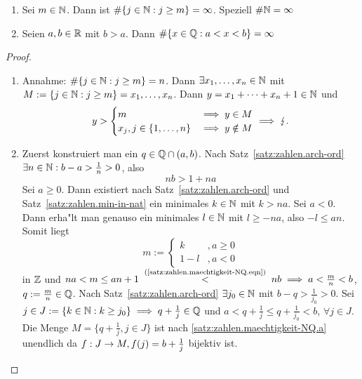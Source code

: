 \documentclass[12pt]{scrreprt}
\begin{document}
\begin{satz}\label{satz:zahlen.maechtigkeit-NQ}
\begin{enumerate}
\item \label{satz:zahlen.maechtigkeit-NQ.a}
Sei $m \in \mathbb{N}$. Dann ist $\#\{j\in\mathbb{N}:j\ge m\} = \infty$. Speziell $\#\mathbb{N} = \infty$
\item \label{satz:zahlen.maechtigkeit-NQ.b}
Seien $a, b \in \mathbb{R}$ mit $b > a$. Dann $\#\{x \in \mathbb{Q}:a < x<b\} = \infty$
\end{enumerate}
\end{satz}
\begin{proof}
\begin{enumerate}
\item Annahme: $\#\{j\in\mathbb{N}:j\ge m\} = n$. Dann $\exists x_1,\dotsc,x_n\in \mathbb{N}$
mit $M:=\{j\in\mathbb{N}:j\ge m\}={x_1, \dotsc, x_n}$. Dann
$y=x_1 + \dotsb  + x_n + 1 \in \mathbb{N}$ und 
\[ y >\begin{cases} m &\implies y \in M \\ x_j, j \in \{1, \dotsc, n\} & \implies y \notin M \end{cases}\implies\lightning.\]
\item Zuerst konstruiert man ein $q \in \mathbb{Q} \cap (a,b)$. Nach Satz~\ref{satz:zahlen.arch-ord} 
$\exists n \in \mathbb{N} : b-a > \frac{1}{n} > 0$, also 
\begin{equation}
nb > 1+na \label{satz:zahlen.maechtigkeit-NQ.eqn}\tag{$*$}
\end{equation}
Sei $a \ge 0$. Dann existiert nach Satz~\ref{satz:zahlen.arch-ord} und Satz~\ref{satz:zahlen.min-in-nat} ein minimales
$k\in\mathbb{N}$ mit $k>na$. Sei $a<0$. Dann erha"lt man genauso ein minimales $l \in \mathbb{N}$ mit $l \ge -na$,
also $-l\le an$. Somit liegt 
\[m:= 
\begin{cases}
	k &,a \ge0 \\
	1-l &, a<0
\end{cases}\]
in $\mathbb{Z}$ und $na < m \le an+1 \nach{<}{(\ref{satz:zahlen.maechtigkeit-NQ.eqn})} nb \folgt
a< \frac{m}{n} < b$, $q:= \frac{m}{n} \in \mathbb{Q}$.
Nach Satz~\ref{satz:zahlen.arch-ord} $\exists j_0 \in \mathbb{N}$ mit $b-q > \frac{1}{j_0} > 0$.
Sei $j \in J := \{k\in\mathbb{N}:k\ge j_0\} \implies q + \frac{1}{j} \in \mathbb{Q}$ und $a < q + \frac{1}{j}\le q + \frac{1}{j_0} < b$, 
$\forall j \in J$. Die Menge $M = \{q + \frac{1}{j}, j\in J\}$ ist nach \ref{satz:zahlen.maechtigkeit-NQ.a} unendlich da 
$f: J\rightarrow M, f(j) = b + \frac{1}{j}$ bijektiv ist.
\end{enumerate}
\end{proof}
\end{document}
